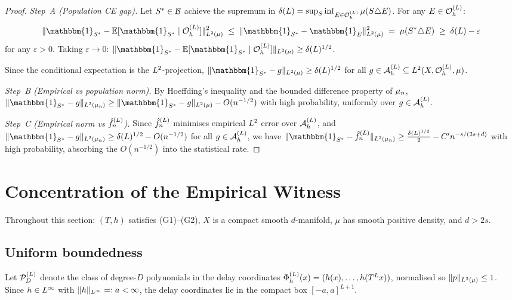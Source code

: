 \begin{proof}
\emph{Step~A (Population CE gap).}
Let $S^* \in \mathcal{B}$ achieve the supremum in $\delta(L) = \sup_S \inf_{E \in \mathcal{O}_h^{(L)}} \mu(S \triangle E)$.
For any $E \in \mathcal{O}_h^{(L)}$:
\[
  \|\mathbbm{1}_{S^*} - \mathbb{E}[\mathbbm{1}_{S^*} \mid \OhL]\|_{\Lp{2}(\mu)}^2
  \;\leq\;
  \|\mathbbm{1}_{S^*} - \mathbbm{1}_E\|_{\Lp{2}(\mu)}^2
  \;=\; \mu(S^* \triangle E) \;\geq\; \delta(L) - \varepsilon
\]
for any $\varepsilon > 0$.
Taking $\varepsilon \to 0$: $\|\mathbbm{1}_{S^*} - \mathbb{E}[\mathbbm{1}_{S^*} \mid \OhL]\|_{\Lp{2}(\mu)}
\geq \delta(L)^{1/2}$.

Since the conditional expectation is the $L^{2}$-projection,
$\|\mathbbm{1}_{S^*} - g\|_{\Lp{2}(\mu)} \geq \delta(L)^{1/2}$ for all $g \in \mathcal{A}_h^{(L)} \subseteq L^{2}(X, \mathcal{O}_h^{(L)}, \mu)$.

\emph{Step~B (Empirical vs population norm).}
By Hoeffding's inequality and the bounded difference property of $\mu_n$,
$\|\mathbbm{1}_{S^*} - g\|_{\Lp{2}(\mun)} \geq \|\mathbbm{1}_{S^*} - g\|_{\Lp{2}(\mu)} - O(n^{-1/2})$
with high probability, uniformly over $g \in \mathcal{A}_h^{(L)}$.

\emph{Step~C (Empirical norm vs $\hat{f}_n^{(L)}$).}
Since $\hat{f}_n^{(L)}$ minimises empirical $L^{2}$ error over $\mathcal{A}_h^{(L)}$, and
$\|\mathbbm{1}_{S^*} - g\|_{\Lp{2}(\mun)} \geq \delta(L)^{1/2} - O(n^{-1/2})$
for all $g \in \mathcal{A}_h^{(L)}$, we have
$\|\mathbbm{1}_{S^*} - \fhat\|_{\Lp{2}(\mun)} \geq \frac{\delta(L)^{1/2}}{2} - C' n^{-s/(2s+d)}$
with high probability, absorbing the $O(n^{-1/2})$ into the statistical rate.
\end{proof}

\section{Concentration of the Empirical Witness}
\label{III:sec:concentration}

Throughout this section: $(T,h)$ satisfies (G1)--(G2), $X$ is a compact
smooth $d$-manifold, $\mu$ has smooth positive density, and $d > 2s$.

\subsection{Uniform boundedness}
\label{III:subsec:bounded}

Let $\mathcal{P}_D^{(L)}$ denote the class of degree-$D$ polynomials in the delay coordinates
$\Phi_h^{(L)}(x) = (h(x),\ldots,h(T^L x))$, normalised so $\|p\|_{L^{2}(\mu)} \leq 1$.
Since $h \in L^{\infty}$ with $\|h\|_{L^{\infty}} =: a < \infty$, the delay
coordinates lie in the compact box $[-a,a]^{L+1}$.

